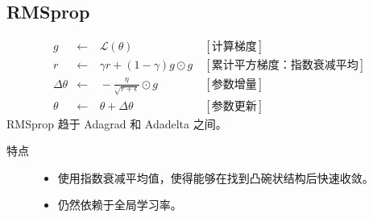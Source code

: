 \documentclass[letterpaper,10pt,english]{sphinxmanual}
\begin{document}
\subsection{RMSprop}
\label{\detokenize{deepLearning/08_optimizer:rmsprop}}\begin{equation*}
\begin{split}g & \leftarrow &\ \mathcal{L}(\theta) &\  [\text{计算梯度}] \\
r & \leftarrow &\ \gamma r + (1 - \gamma) g \odot g &\  [\text{累计平方梯度：指数衰减平均}] \\
\Delta \theta & \leftarrow &\  - \frac{\eta}{\sqrt{r+\epsilon}} \odot g &\ [\text{参数增量}] \\
\theta & \leftarrow &\  \theta + \Delta \theta &\ [\text{参数更新}]\end{split}
\end{equation*}
RMSprop 趋于 Adagrad 和 Adadelta 之间。
\begin{description}
\item[{特点}] \leavevmode\begin{itemize}
\item {} 
使用指数衰减平均值，使得能够在找到凸碗状结构后快速收敛。

\item {} 
仍然依赖于全局学习率。

\end{itemize}

\end{description}
\end{document}
